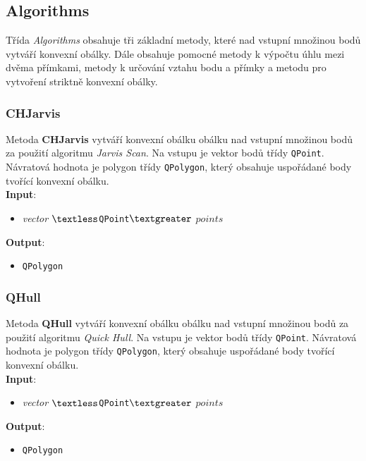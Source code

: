\documentclass[a4paper, 12pt]{article}
\begin{document}
\subsection{Algorithms}
Třída \textit{Algorithms} obsahuje tři základní metody, které nad vstupní množinou bodů vytváří konvexní obálky. Dále obsahuje pomocné metody k výpočtu úhlu mezi dvěma přímkami, metody k určování vztahu bodu a přímky a metodu pro vytvoření striktně konvexní obálky.

\subsubsection*{CHJarvis}
Metoda \textbf{CHJarvis} vytváří konvexní obálku obálku nad vstupní množinou bodů za použití algoritmu \textit{Jarvis Scan}. Na vstupu je vektor bodů třídy \texttt{QPoint}. Návratová hodnota je polygon třídy \texttt{QPolygon}, který obsahuje uspořádané body tvořící konvexní obálku.\\

\textbf{Input}:
\begin{itemize}
\item \textsl{vector} $\textless$\texttt{QPoint}$\textgreater$ $points$
\end{itemize}

\textbf{Output}:
\begin{itemize}
\item \texttt{QPolygon}
\end{itemize}

\subsubsection*{QHull}
Metoda \textbf{QHull} vytváří konvexní obálku obálku nad vstupní množinou bodů za použití algoritmu \textit{Quick Hull}. Na vstupu je vektor bodů třídy \texttt{QPoint}. Návratová hodnota je polygon třídy \texttt{QPolygon}, který obsahuje uspořádané body tvořící konvexní obálku.\\

\textbf{Input}:
\begin{itemize}
\item \textsl{vector} $\textless$\texttt{QPoint}$\textgreater$ $points$
\end{itemize}

\textbf{Output}:
\begin{itemize}
\item \texttt{QPolygon}
\end{itemize}
\end{document}
